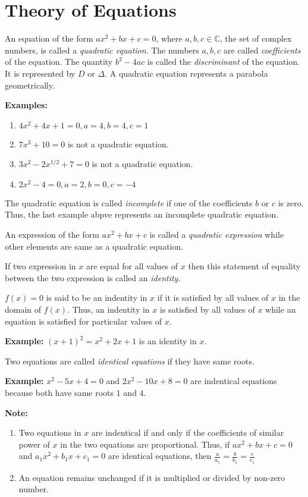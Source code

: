 \chapter{Theory of Equations}
An equation of the form $ax^2 + bx + c = 0$, where $a, b, c\in \mathbb{C}$, the set of complex numbers, is called a \textit{quadratic
  equation}. The numbers $a, b, c$ are called \textit{coefficients} of the equation. The quantity $b^2 - 4ac$ is called the
\textit{discriminant} of the equation. It is represented by $D$ or $\Delta$. A quadratic equation represents a parabola
geometrically.

\noindent\textbf{Examples:}
\begin{enumerate}
\item $4x^2 + 4x + 1 = 0, a = 4, b = 4, c = 1$
\item $7x^3 + 10 = 0$ is not a quadratic equation.
\item $3x^2 -2x^{1/2} + 7 = 0$ is not a quadratic equation.
\item $2x^2 - 4 = 0, a = 2, b = 0, c= -4$
\end{enumerate}

The quadratic equation is called \textit{incomplete} if one of the coefficients $b$ or $c$ is zero. Thus, the last example abpve
represents an incomplete quadratic equation.

An expression of the form $ax^2 + bx + c$ is called a \textit{quadratic expression} while other elements are same as a quadratic
equation.

If two expression in $x$ are equal for all values of $x$ then this statement of equality between the two expression is called an
\textit{identity}.

$f(x) = 0$ is said to be an indentity in $x$ if it is satisfied by all values of $x$ in the domain of $f(x)$. Thus, an indentity in
$x$ is satisfied by all values of $x$ while an equation is satisfied for particular values of $x$.

\noindent\textbf{Example:} $(x + 1)^2 = x^2 + 2x + 1$ is an identity in $x$.

Two equations are called \textit{identical equations} if they have same roots.

\noindent\textbf{Example:} $x^2 - 5x + 4 = 0$ and $2x^2 - 10x + 8 = 0$ are indentical equations because both have same roots $1$ and $4$.

\noindent\textbf{Note:}
\begin{enumerate}
\item Two equations in $x$ are indentical if and only if the coefficients of similar power of $x$ in the two equations are
  proportional. Thus, if $ax^2 + bx + c = 0$ and $a_1x^2 + b_1x + c_1 = 0$ are identical equations, then $\frac{a}{a_1} =
  \frac{b}{b_1} = \frac{c}{c_1}$
\item An equation remains unchanged if it is multiplied or divided by non-zero number.
\end{enumerate}

